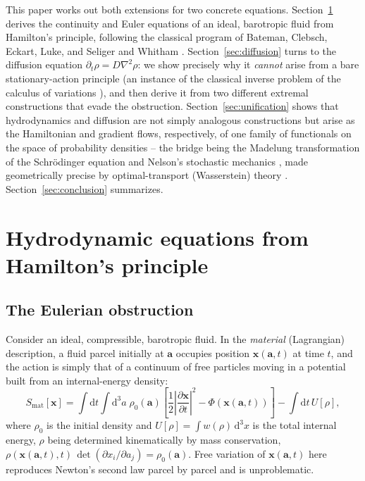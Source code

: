 \documentclass[11pt]{article}
\newcommand{\rd}{\mathrm{d}}
\newcommand{\pd}[2]{\frac{\partial #1}{\partial #2}}
\newcommand{\lap}{\nabla^2}
\newcommand{\bx}{\mathbf{x}}
\newcommand{\ba}{\mathbf{a}}
\begin{document}
This paper works out both extensions for two concrete equations. Section~\ref{sec:hydro} derives the continuity and Euler equations of an ideal, barotropic fluid from Hamilton's principle, following the classical program of Bateman, Clebsch, Eckart, Luke, and Seliger and Whitham \cite{Bateman1929,Clebsch1859,Eckart1960,Luke1967,SeligerWhitham1968}. Section~\ref{sec:diffusion} turns to the diffusion equation $\partial_t\rho = D\lap\rho$: we show precisely why it \emph{cannot} arise from a bare stationary-action principle (an instance of the classical inverse problem of the calculus of variations \cite{Bauer1931,Bateman1931,MorseFeshbach1953}), and then derive it from two different extremal constructions that evade the obstruction. Section~\ref{sec:unification} shows that hydrodynamics and diffusion are not simply analogous constructions but arise as the Hamiltonian and gradient flows, respectively, of one family of functionals on the space of probability densities -- the bridge being the Madelung transformation of the Schr\"odinger equation \cite{Madelung1927} and Nelson's stochastic mechanics \cite{Nelson1966,GuerraMorato1983,Reginatto1998}, made geometrically precise by optimal-transport (Wasserstein) theory \cite{JordanKinderlehrerOtto1998,Otto2001,BenamouBrenier2000,vonRenesse2012,GianazzaSavareToscani2009}. Section~\ref{sec:conclusion} summarizes.

\section{Hydrodynamic equations from Hamilton's principle}
\label{sec:hydro}

\subsection{The Eulerian obstruction}

Consider an ideal, compressible, barotropic fluid. In the \emph{material} (Lagrangian) description, a fluid parcel initially at $\ba$ occupies position $\bx(\ba,t)$ at time $t$, and the action is simply that of a continuum of free particles moving in a potential built from an internal-energy density:
\begin{equation}
S_{\mathrm{mat}}[\bx] = \int \rd t \int \rd^3 a\; \rho_0(\ba)\left[\frac12\left|\pd{\bx}{t}\right|^2 - \Phi(\bx(\ba,t))\right] - \int \rd t\, U[\rho],
\end{equation}
where $\rho_0$ is the initial density and $U[\rho]=\int w(\rho)\,\rd^3x$ is the total internal energy, $\rho$ being determined kinematically by mass conservation, $\rho(\bx(\ba,t),t)\,\det(\partial x_i/\partial a_j) = \rho_0(\ba)$. Free variation of $\bx(\ba,t)$ here reproduces Newton's second law parcel by parcel and is unproblematic.
\end{document}

